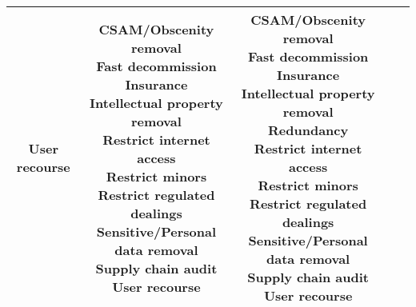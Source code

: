 \documentclass[fleqn]{article}
\begin{document}
\begin{landscape}
\begin{table}[H]
\begin{tabular}{|c|c|c|c|c|}
{			\textbullet\hspace{3pt} User recourse \\
		}
		& \makecell[l]{
			\textbullet\hspace{3pt} CSAM/Obscenity removal \\ 	
			\textbullet\hspace{3pt} Fast decommission \\ 	
			\textbullet\hspace{3pt} Insurance \\ 	
			\textbullet\hspace{3pt} Intellectual property removal \\ 	
			\textbullet\hspace{3pt} Restrict internet access \\ 	
			\textbullet\hspace{3pt} Restrict minors \\ 	
			\textbullet\hspace{3pt} Restrict regulated dealings \\ 	
			\textbullet\hspace{3pt} Sensitive/Personal data removal \\ 	
			\textbullet\hspace{3pt} Supply chain audit \\ 	
			\textbullet\hspace{3pt} User recourse \\ 						 	 		 	 
		}
		& \makecell[l]{
			\textbullet\hspace{3pt} CSAM/Obscenity removal \\ 	
			\textbullet\hspace{3pt} Fast decommission \\ 	
			\textbullet\hspace{3pt} Insurance \\ 	
			\textbullet\hspace{3pt} Intellectual property removal \\ 	
			\textbullet\hspace{3pt} Redundancy \\ 	
			\textbullet\hspace{3pt} Restrict internet access \\ 	
			\textbullet\hspace{3pt} Restrict minors \\ 	
			\textbullet\hspace{3pt} Restrict regulated dealings \\ 	
			\textbullet\hspace{3pt} Sensitive/Personal data removal \\ 	
			\textbullet\hspace{3pt} Supply chain audit \\ 	
			\textbullet\hspace{3pt} User recourse \\				 	 
		} 
		\\
		\hline
	\end{tabular}
	\label{table:high_risk_plan_by_gai_risk_cont}
\end{table}


\end{landscape}
\end{document}
